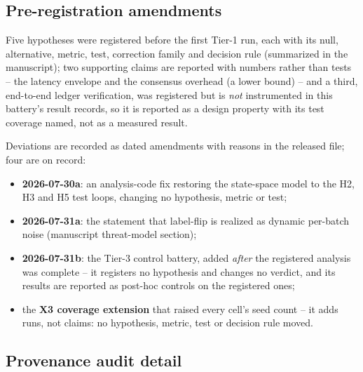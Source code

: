 \documentclass[review,12pt]{elsarticle}
\begin{document}
\subsection{Pre-registration amendments}
\label{sec:sup-amendments}

Five hypotheses were registered before the first Tier-1 run, each with
its null, alternative, metric, test, correction family and decision rule
(summarized in the manuscript); two supporting claims are reported with
numbers rather than tests -- the latency envelope and the consensus
overhead (a lower bound) -- and a third, end-to-end ledger verification,
was registered but is \emph{not} instrumented in this battery's result
records, so it is reported as a design property with its test coverage
named, not as a measured result.

Deviations are recorded as dated amendments with reasons in the released
file; four are on record:
\begin{itemize}\setlength{\itemsep}{2pt}
\item \textbf{2026-07-30a}: an analysis-code fix restoring the
  state-space model to the H2, H3 and H5 test loops, changing no
  hypothesis, metric or test;
\item \textbf{2026-07-31a}: the statement that label-flip is realized as
  dynamic per-batch noise (manuscript threat-model section);
\item \textbf{2026-07-31b}: the Tier-3 control battery, added
  \emph{after} the registered analysis was complete -- it registers no
  hypothesis and changes no verdict, and its results are reported as
  post-hoc controls on the registered ones;
\item the \textbf{X3 coverage extension} that raised every cell's seed
  count -- it adds runs, not claims: no hypothesis, metric, test or
  decision rule moved.
\end{itemize}

\subsection{Provenance audit detail}
\label{sec:sup-provenance}
\end{document}
